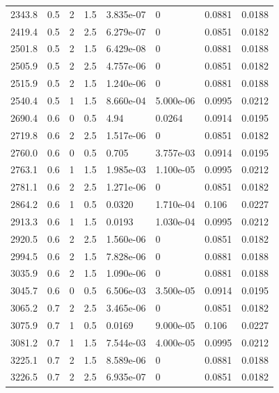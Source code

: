 \documentclass[preview]{standalone}
\begin{document}
{{\begin{tabular}{L{1.2cm}C{1.2cm} C{0.3cm}C{0.5cm} C{1.4cm}C{1.4cm} C{1.4cm}C{1.4cm}}
  2343.8  &   0.5  & 2     & 1.5 &  3.835e-07  & 0  & 0.0881 &  0.0188   \\ 
  2419.4  &   0.5  & 2     & 2.5 &  6.279e-07  & 0  & 0.0851 &  0.0182   \\ 
  2501.8  &   0.5  & 2     & 1.5 &  6.429e-08  & 0  & 0.0881 &  0.0188   \\ 
  2505.9  &   0.5  & 2     & 2.5 &  4.757e-06  & 0  & 0.0851 &  0.0182   \\ 
  2515.9  &   0.5  & 2     & 1.5 &  1.240e-06  & 0  & 0.0881 &  0.0188   \\ 
  2540.4  &   0.5  & 1     & 1.5 &  8.660e-04  & 5.000e-06  & 0.0995 &  0.0212   \\ 
  2690.4  &   0.6  & 0     & 0.5 &  4.94  & 0.0264  & 0.0914 &  0.0195   \\ 
  2719.8  &   0.6  & 2     & 2.5 &  1.517e-06  & 0  & 0.0851 &  0.0182   \\ 
  2760.0  &   0.6  & 0     & 0.5 &  0.705  & 3.757e-03  & 0.0914 &  0.0195   \\ 
  2763.1  &   0.6  & 1     & 1.5 &  1.985e-03  & 1.100e-05  & 0.0995 &  0.0212   \\ 
  2781.1  &   0.6  & 2     & 2.5 &  1.271e-06  & 0  & 0.0851 &  0.0182   \\ 
  2864.2  &   0.6  & 1     & 0.5 &  0.0320  & 1.710e-04  & 0.106 &  0.0227   \\ 
  2913.3  &   0.6  & 1     & 1.5 &  0.0193  & 1.030e-04  & 0.0995 &  0.0212   \\ 
  2920.5  &   0.6  & 2     & 2.5 &  1.560e-06  & 0  & 0.0851 &  0.0182   \\ 
  2994.5  &   0.6  & 2     & 1.5 &  7.828e-06  & 0  & 0.0881 &  0.0188   \\ 
  3035.9  &   0.6  & 2     & 1.5 &  1.090e-06  & 0  & 0.0881 &  0.0188   \\ 
  3045.7  &   0.6  & 0     & 0.5 &  6.506e-03  & 3.500e-05  & 0.0914 &  0.0195   \\ 
  3065.2  &   0.7  & 2     & 2.5 &  3.465e-06  & 0  & 0.0851 &  0.0182   \\ 
  3075.9  &   0.7  & 1     & 0.5 &  0.0169  & 9.000e-05  & 0.106 &  0.0227   \\ 
  3081.2  &   0.7  & 1     & 1.5 &  7.544e-03  & 4.000e-05  & 0.0995 &  0.0212   \\ 
  3225.1  &   0.7  & 2     & 1.5 &  8.589e-06  & 0  & 0.0881 &  0.0188   \\ 
  3226.5  &   0.7  & 2     & 2.5 &  6.935e-07  & 0  & 0.0851 &  0.0182   \\ 

\end{tabular}}}
\end{document}
